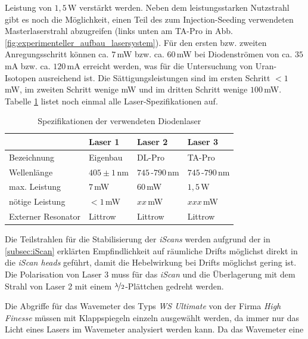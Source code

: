 Leistung von $1,5\,$W verstärkt werden. Neben dem leistungsstarken Nutzstrahl
gibt es noch die Möglichkeit, einen Teil des zum Injection-Seeding verwendeten
Masterlaserstrahl abzugreifen (links unten am TA-Pro in Abb.
\ref{fig:experimenteller_aufbau_lasersystem}). Für den ersten bzw.
zweiten Anregungsschritt können ca. $7\,$mW bzw. ca. $60\,$mW bei Diodenströmen von ca. $35\,$mA bzw. ca.
$120\,$mA erreicht werden, was für die Untersuchung von Uran-Isotopen
ausreichend ist. Die Sättigungsleistungen sind im ersten Schritt $<1\,$mW, im
zweiten Schritt wenige mW und im dritten Schritt wenige $100\,$mW. Tabelle \ref{tab:laser_spezifikationen} listet noch einmal alle
Laser-Spezifikationen auf.
\par
\begin{table}
	\begin{tabular}{p{}|p{}p{}p{}}
		\toprule
		& Laser 1 & Laser 2 & Laser 3\\
		\midrule[1px]
		\hline
		Bezeichnung & Eigenbau & DL-Pro & TA-Pro\\
		Wellenlänge & $405\pm1\,$nm & $745\,$-$790\,$nm & $745\,$-$790\,$nm\\
		max. Leistung & $7\,$mW & $60\,$mW & $1,5\,$W\\
		nötige Leistung & $<1\,$mW & $xx\,$mW & $xxx\,$mW\\
		Externer Resonator & Littrow & Littrow & Littrow\\
		\bottomrule[1px]
	\end{tabular}
	\caption[Spezifikationen der verwendeten Diodenlaser]{Spezifikationen der
	verwendeten Diodenlaser}
	\label{tab:laser_spezifikationen}
\end{table}
Die Teilstrahlen für die Stabilisierung der \textit{iScans} werden aufgrund der
in \ref{subsec:iScan} erklärten Empfindlichkeit auf räumliche Drifts möglichst
direkt in die \textit{iScan heads} geführt, damit die Hebelwirkung bei Drifts
möglichst gering ist. Die Polarisation von Laser 3 muss für das \textit{iScan}
und die Überlagerung mit dem Strahl von Laser 2 mit einem
$\nicefrac{\lambda}{2}$-Plättchen gedreht werden.\par
Die Abgriffe für das Wavemeter des Typs \textit{WS Ultimate} von der Firma \textit{High Finesse}
müssen mit Klappspiegeln einzeln ausgewählt werden, da immer nur das Licht eines Lasers im Wavemeter analysiert werden kann. Da das Wavemeter eine
